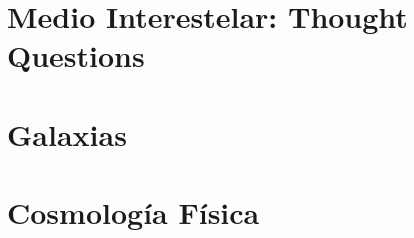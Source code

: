 \documentclass{tufte-handout}
\newcommand{\doccmd}[1]{\texttt{\textbackslash#1}}%
\newcommand{\docopt}[1]{\ensuremath{\langle}\textrm{\textit{#1}}\ensuremath{\rangle}}%
\newcommand{\docarg}[1]{\textrm{\textit{#1}}}%
\newenvironment{docspec}{\begin{quote}\noindent}{\end{quote}}%
\begin{document}
\section{Medio Interestelar: Thought Questions}

\clearpage

\section{Galaxias}

\clearpage

\section{Cosmología Física}

\clearpage




\end{document}
